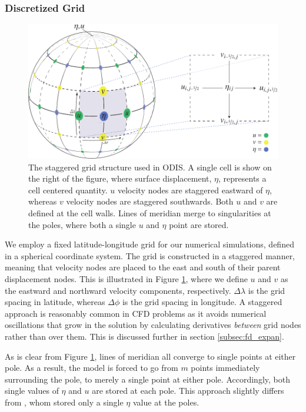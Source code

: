 \subsubsection{Discretized Grid \label{subsec:grid}}

\begin{figure}[t]
\centering
\includegraphics[width=0.8\linewidth]{Figures/GridDiagram}
\caption{The staggered grid structure used in ODIS. A single cell is show on the right of the figure, where surface displacement, $\eta$, represents a cell centered quantity. $u$ velocity nodes are staggered eastward of $\eta$, whereas $v$ velocity nodes are staggered southwards. Both $u$ and $v$ are defined at the cell walls. Lines of meridian merge to singularities at the poles, where both a single $u$ and $\eta$ point are stored.\label{fig:grid}}
\end{figure}

We employ a fixed latitude-longitude grid for our numerical simulations, defined in a spherical coordinate system. The grid is constructed in a staggered manner, meaning that velocity nodes are placed to the east and south of their parent displacement nodes. This is illustrated in Figure \ref{fig:grid}, where we define $u$ and $v$ as the eastward and northward velocity components, respectively. $\Delta \lambda$ is the grid spacing in latitude, whereas $\Delta \phi$ is the grid spacing in longitude. A staggered approach is reasonably common in CFD problems as it avoids numerical oscillations that grow in the solution by calculating derivatives \textit{between} grid nodes rather than over them. This is discussed further in section \ref{subsec:fd_expan}.

As is clear from Figure \ref{fig:grid}, lines of meridian all converge to single points at either pole. As a result, the model is forced to go from $m$ points immediately surrounding the pole, to merely a single point at either pole. Accordingly, both single values of $\eta$ and $u$ are stored at each pole. This approach slightly differs from \citet{sears1995tidal}, whom stored only a single $\eta$ value at the poles.

